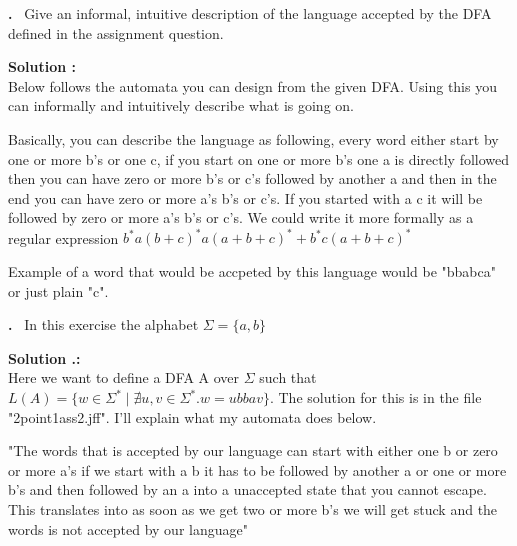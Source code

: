 \documentclass{article}
\newcounter{problem}
\newcounter{solution}
\newcommand\Problem{%
  \stepcounter{problem}%
  \textbf{\theproblem.}~%
  \setcounter{solution}{0}%
}
\newcommand\TheSolution{%
  \textbf{Solution \theproblem:}\\%
}
\newcommand\ASolution{%
  \stepcounter{solution}%
  \textbf{Solution \theproblem.\thesolution:}\\%
}
\begin{document}
\begin{center}
\end{center}

\Problem Give an informal, intuitive description of the language accepted by the DFA defined in the assignment question.

\TheSolution Below follows the automata you can design from the given DFA. Using this you can informally and intuitively describe what is going on. 

\begin{center}
\end{center}

Basically, you can describe the language as following, every word either
start by one or more b's or one c, if you start on one or more b's one a is 
directly followed then you can have zero or more b's or c's followed by another
a and then in the end you can have zero or more a's b's or c's. If you started 
with a c it will be followed by zero or more a's b's or c's. We could write it more 
formally as a regular expression \textbf{$b^*a(b+c)^*a(a+b+c)^* + b^*c(a+b+c)^*$}

Example of a word that would be accpeted by this language would be "bbabca" or just 
plain "c".

\newpage
\Problem In this exercise the alphabet $\Sigma = \{a,b\}$

\ASolution Here we want to define a DFA A over $\Sigma$ such that $L(A) = \{w \in \Sigma^* \mid \nexists u,v \in \Sigma^*. w = ubbav \}$. The solution for this is in the file "2point1ass2.jff". I'll explain what my automata does below.

\begin{center}
    "The words that is accepted by our language can start with 
    either one b or zero or more a's if we start with a b it 
    has to be followed by another a or one or more b's and then 
    followed by an a into a unaccepted state that you cannot 
    escape. This translates into as soon as we get two or more 
    b's we will get stuck and the words is not accepted by our language"
\end{center}
\end{document}
